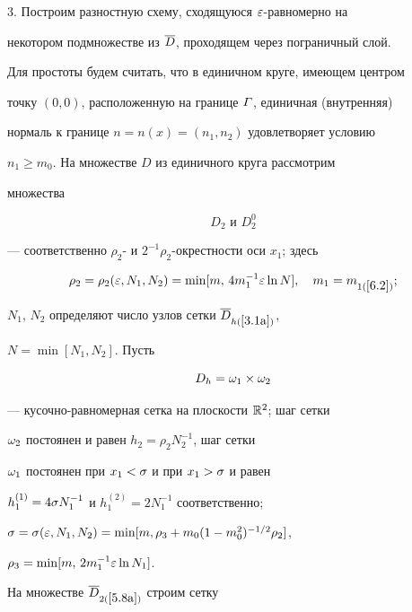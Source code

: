 3. Построим разностную схему, сходящуюся $\varepsilon$-равномерно на


некотором подмножестве из $\overline{D}$, проходящем через пограничный слой.


Для простоты будем считать, что в единичном круге, имеющем центром


точку $(0,0)$, расположенную на границе $\varGamma$, единичная (внутренняя)


нормаль к границе $n=n(x)=(n_1,n_2)$ удовлетворяет условию 


$n_1\ge m_0$. На множестве $D$ из единичного круга рассмотрим


множества


\beqs \label{5.8}


\begin{equation} \label{5.8a}


D_2 \text{ \ и \ } D_2^0


\end{equation}


--- соответственно $\rho_2$- и $2^{-1}\rho_2$-окрестности оси $x_1$; здесь


\begin{equation} \label{5.8b}


\rho_2=\rho_2(\eps,N_1,N_2)=\min[m,\,


4m_1^{-1}\eps\ln N],\quad m_1=m_{1(\ref{6.2})};


\end{equation}


$N_1$, $N_2$ определяют число узлов сетки $\overline{D}_{h(\ref{3.1a})}$,


$N=\min[N_1, N_2]$. Пусть


\begin{equation} \label{5.8c}


D_h=\om_1\times \om_2


\end{equation}


--- кусочно-равномерная сетка на плоскости $\Bbb R^2$; шаг сетки


$\omega_2$  постоянен и равен $h_2=\rho_2N_2^{-1}$, шаг сетки


$\omega_1$  постоянен при $x_1< \sigma$ и при $x_1> \sigma$ и равен


$h_1^{(1)}=4\sigma N_1^{-1}$ и $h_1^{(2)}=2 N_1^{-1}$ соответственно;


$\sigma=\sigma(\varepsilon,N_1,N_2)=\min[m, \rho_3+m_0(1-m_0^2)^{-1/2}\rho_2]$, 


$\rho_3=\min[m,\, 2m_1^{-1}\varepsilon\ln N_1]$.


На множестве $\overline{D}_{2(\ref{5.8a})}$ строим сетку



